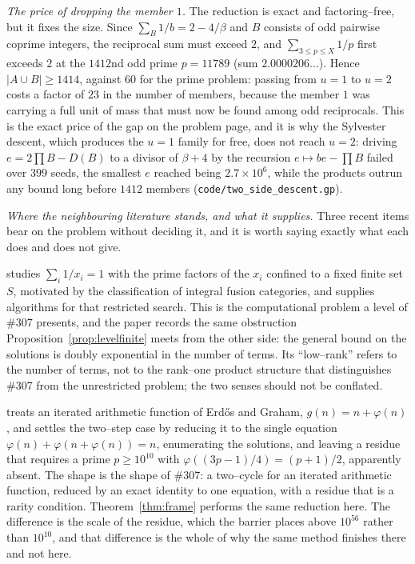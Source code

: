 \documentclass[11pt]{article}
\theoremstyle{definition}
\begin{document}
\emph{The price of dropping the member $1$.} The reduction is exact and factoring--free, but it fixes the size. Since
$\sum_B1/b=2-4/\beta$ and $B$ consists of odd pairwise coprime integers, the reciprocal sum must
exceed $2$, and $\sum_{3\le p\le X}1/p$ first exceeds $2$ at the $1412$nd odd prime $p=11789$
\textup{(}sum $2.0000206\ldots$\textup{)}. Hence $|A\cup B|\ge1414$, against $60$ for the prime
problem: passing from $u=1$ to $u=2$ costs a factor of $23$ in the number of members, because the
member $1$ was carrying a full unit of mass that must now be found among odd reciprocals.
This is the exact price of the gap on the problem page, and it is why the Sylvester descent, which
produces the $u=1$ family for free, does not reach $u=2$: driving $e=2\prod B-D(B)$ to a divisor of
$\beta+4$ by the recursion $e\mapsto be-\prod B$ failed over $399$ seeds, the smallest $e$ reached
being $2.7\times10^{6}$, while the products outrun any bound long before $1412$ members
\textup{(\texttt{code/two\_side\_descent.gp})}.


\emph{Where the neighbouring literature stands, and what it supplies.} Three recent items bear on the problem without deciding it, and it is worth saying exactly what each
does and does not give.

\cite{FewPrimes2025} studies $\sum_i1/x_i=1$ with the prime factors of the $x_i$ confined to a fixed
finite set $S$, motivated by the classification of integral fusion categories, and supplies
algorithms for that restricted search. This is the computational problem a level of \#307 presents,
and the paper records the same obstruction Proposition~\ref{prop:levelfinite} meets from the other
side: the general bound on the solutions is doubly exponential in the number of terms. Its
``low--rank'' refers to the number of terms, not to the rank--one product structure that
distinguishes \#307 from the unrestricted problem; the two senses should not be conflated.

\cite{Steinerberger2025} treats an iterated arithmetic function of Erd\H{o}s and Graham,
$g(n)=n+\varphi(n)$, and settles the two--step case by reducing it to the single equation
$\varphi(n)+\varphi(n+\varphi(n))=n$, enumerating the solutions, and leaving a residue that requires
a prime $p\ge10^{10}$ with $\varphi((3p-1)/4)=(p+1)/2$, apparently absent. The shape is the shape of
\#307: a two--cycle for an iterated arithmetic function, reduced by an exact identity to one
equation, with a residue that is a rarity condition. Theorem~\ref{thm:frame} performs the same
reduction here. The difference is the scale of the residue, which the barrier places above
$10^{56}$ rather than $10^{10}$, and that difference is the whole of why the same method finishes
there and not here.
\end{document}

